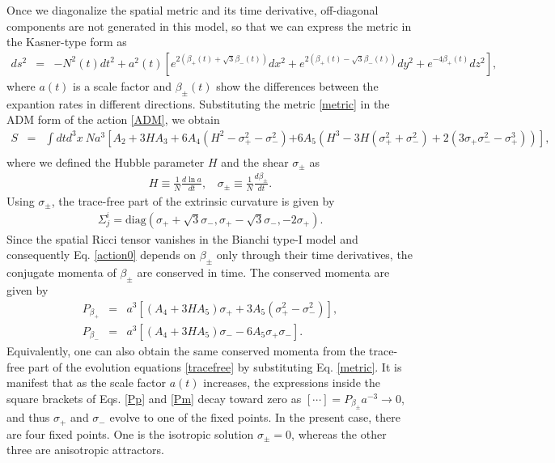 \documentclass[aps,prd,preprint,superscriptaddress,nofootinbib,tightenlines]{revtex4-1}
\begin{document}
Once we diagonalize the spatial metric and its time derivative, off-diagonal components are not generated in this model,
so that we can express the metric in the Kasner-type form as
\begin{eqnarray}
ds^2&=&-N^2(t)dt^2
+a^2(t)
\left[
e^{2(\beta_+(t)+\sqrt{3}\beta_-(t))}dx^2 +
e^{2(\beta_+(t)-\sqrt{3}\beta_-(t))}dy^2 +
e^{-4\beta_+(t)}dz^2
\right] ,
\label{metric}
\end{eqnarray}
where $a(t)$ is a scale factor and $\beta_\pm(t)$ show the
differences between the expantion rates in different directions.
Substituting the metric \eqref{metric} in the ADM form of the action \eqref{ADM},
we obtain
\begin{eqnarray}
 S &=&
 \int dt d^3x~
N a^{3}
 \left[
 A_2 + 3 H A_3 + 6 A_4 (H^2-\sigma_+^2-\sigma_-^2)
 \right.
 \left.
 + 6A_5(H^3-3H(\sigma_+^2+\sigma_-^2)+2(3\sigma_+\sigma_-^2 - \sigma_+^3))
 \right],
 \nonumber\\
 \label{action0}
\end{eqnarray}
where we defined the Hubble parameter $H$ and the shear $\sigma_\pm$ as
\begin{eqnarray}
H \equiv \frac{1}{N}\frac{d\ln a}{dt} , ~~~~
\sigma_\pm \equiv \frac{1}{N}\frac{d\beta_\pm}{dt}.
\end{eqnarray}
Using $\sigma_\pm$, the trace-free part of the extrinsic curvature is given by
\begin{eqnarray}
\Sigma^i_j = \mathrm{diag} \left( \sigma_+ + \sqrt{3} \sigma_- , \sigma_+ - \sqrt{3} \sigma_- , -2 \sigma_+ \right).
\label{Sigma}
\end{eqnarray}
Since the spatial Ricci tensor vanishes in the Bianchi type-I model
and consequently Eq. \eqref{action0}
depends on $\beta_\pm$ only through their time derivatives,
the conjugate momenta of $\beta_\pm$ are conserved in time.
The conserved momenta are given by
\begin{eqnarray}
P_{\beta_+}
&=&
a^3
\left[
(A_4+3HA_5)\sigma_+
+3A_5(\sigma_+^2-\sigma_-^2)
\right],\label{Pp}
 \\
P_{\beta_-}
&=&
a^3
\left[
(A_4+3HA_5)\sigma_-
-6A_5\sigma_+ \sigma_-
\right] .%
\label{Pm}
\end{eqnarray}
Equivalently,
one can also obtain the same conserved momenta
from the trace-free part of the evolution equations \eqref{tracefree}
by substituting Eq. \eqref{metric}.
It is manifest that as the scale factor $a(t)$ increases,
the expressions inside the square brackets of Eqs. \eqref{Pp} and \eqref{Pm}
decay toward zero as $[\cdots] = P_{\beta_\pm}a^{-3} \to 0$, and
thus $\sigma_+$ and $\sigma_-$ evolve to one of the fixed points.
In the present case, there are four fixed points.
One is the isotropic solution $\sigma_\pm=0$,
whereas the other three are anisotropic attractors.
\end{document}
